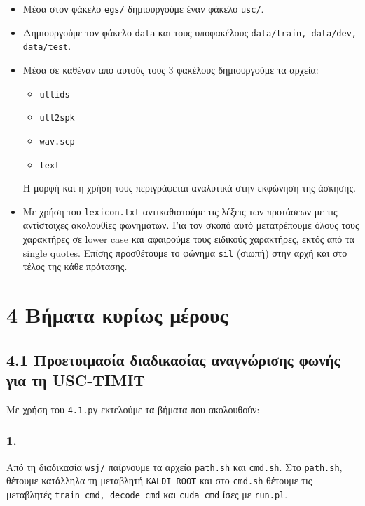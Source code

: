 \documentclass[a4paper, 12pt]{article}
\begin{document}
        \begin{itemize}
            \item Μέσα στον φάκελο \verb|egs/| δημιουργούμε έναν φάκελο \verb|usc/|.
            
            \item Δημιουργούμε τον φάκελο \verb|data| και τους υποφακέλους \verb|data/train, data/dev, data/test|.
            
            \item Μέσα σε καθέναν από αυτούς τους 3 φακέλους δημιουργούμε τα αρχεία:
                \begin{itemize}
                    \item \verb|uttids|
                    \item \verb|utt2spk|
                    \item \verb|wav.scp|
                    \item \verb|text|
                \end{itemize}
                
                Η μορφή και η χρήση τους περιγράφεται αναλυτικά στην εκφώνηση της άσκησης.
            
            \item Με χρήση του \verb|lexicon.txt| αντικαθιστούμε τις λέξεις των προτάσεων με τις αντίστοιχες ακολουθίες φωνημάτων. Για τον σκοπό αυτό μετατρέπουμε όλους τους χαρακτήρες σε lower case και αφαιρούμε τους ειδικούς χαρακτήρες, εκτός από τα single quotes. Επίσης προσθέτουμε το φώνημα \verb|sil| (σιωπή) στην αρχή και στο τέλος της κάθε πρότασης.
        \end{itemize}

\section*{4 Βήματα κυρίως μέρους} 
    
    \subsection*{4.1 Προετοιμασία διαδικασίας αναγνώρισης φωνής για τη USC-TIMIT}
    
        Με χρήση του \verb|4.1.py| εκτελούμε τα βήματα που ακολουθούν:
        
        \subsubsection*{1.}
            Από τη διαδικασία \verb|wsj/| παίρνουμε τα αρχεία \verb|path.sh| και \verb|cmd.sh|. Στο \verb|path.sh|, θέτουμε κατάλληλα τη μεταβλητή \verb|KALDI_ROOT| και στο \verb|cmd.sh|  θέτουμε τις μεταβλητές \verb|train_cmd, decode_cmd| και \verb|cuda_cmd| ίσες με \verb|run.pl|.
        
\end{document}
